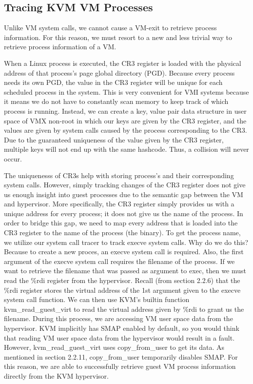 \documentclass{report}
\begin{document}
\begin{spacing}{1.5}
\section{Tracing KVM VM Processes}

{\large
Unlike VM system calls, we cannot cause a VM-exit to retrieve process information. For this reason, we must resort to a new and less trivial way to retrieve process information of a VM.
\newline
}

{\large
\noindent When a Linux process is executed, the CR3 register is loaded with the physical address of that process's page global directory (PGD). Because every process needs its own PGD, the value in the CR3 register will be unique for each scheduled process in the system. This is very convenient for VMI systems because it means we do not have to constantly scan memory to keep track of which process is running. Instead, we can create a key, value pair data structure in user space of VMX non-root in which our keys are given by the CR3 register, and the values are given by system calls caused by the process corresponding to the CR3. Due to the guaranteed uniqueness of the value given by the CR3 register, multiple keys will not end up with the same hashcode. Thus, a collision will never occur.
\newline
}

{\large
\noindent The uniquenesss of CR3s help with storing process's and their corresponding system calls. However, simply tracking changes of the CR3 register does not give us enough insight into guest processes due to the semantic gap between the VM and hypervisor. More specifically, the CR3 register simply provides us with a unique address for every process; it does not give us the name of the process. In order to bridge this gap, we need to map every address that is loaded into the CR3 register to the name of the process (the binary). To get the process name, we utilize our system call tracer to track execve system calls. Why do we do this? Because to create a new proces, an execve system call is required. Also, the first argument of the execve system call requires the filename of the process. If we want to retrieve the filename that was passed as argument to exec, then we must read the \%rdi register from the hypervisor. Recall (from section 2.2.6) that the \%rdi register stores the virtual address of the 1st argument given to the execve system call function. We can then use KVM's builtin function kvm\_read\_guest\_virt to read the virtual address given by \%rdi to grant us the filename. During this process, we are accessing VM user space data from the hypervisor. KVM implicitly has SMAP enabled by default, so you would think that reading VM user space data from the hypervisor would result in a fault. However, kvm\_read\_guest\_virt uses copy\_from\_user to get its data. As mentioned in section 2.2.11, copy\_from\_user temporarily disables SMAP. For this reason, we are able to successfully retrieve guest VM process information directly from the KVM hypervisor.
}



\end{spacing}
\end{document}
